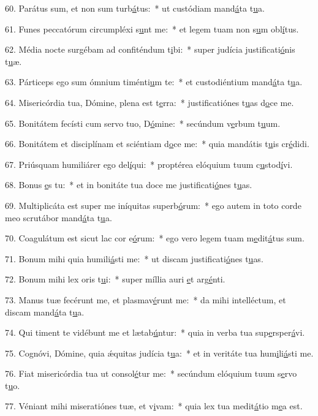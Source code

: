 60. Parátus sum, et non sum turb\uline{á}tus:~* ut custódiam mand\uline{á}ta t\uline{u}a.\par 
61. Funes peccatórum circumpléxi s\uline{u}nt me:~* et legem tuam non s\uline{u}m obl\uline{í}tus.\par 
62. Média nocte surgébam ad confiténdum t\uline{i}bi:~* super judícia justificati\uline{ó}nis t\uline{u}æ.\par 
63. Párticeps ego sum ómnium timénti\uline{u}m te:~* et custodiéntium mand\uline{á}ta t\uline{u}a.\par 
64. Misericórdia tua, Dómine, plena est t\uline{e}rra:~* justificatiónes t\uline{u}as d\uline{o}ce me.\par 
65. Bonitátem fecísti cum servo tuo, D\uline{ó}mine:~* secúndum v\uline{e}rbum t\uline{u}um.\par 
66. Bonitátem et disciplínam et sciéntiam d\uline{o}ce me:~* quia mandátis t\uline{u}is cr\uline{é}didi.\par 
67. Priúsquam humiliárer ego del\uline{í}qui:~* proptérea elóquium tuum c\uline{u}stod\uline{í}vi.\par 
68. Bonus \uline{e}s tu:~* et in bonitáte tua doce me justificati\uline{ó}nes t\uline{u}as.\par 
69. Multiplicáta est super me iníquitas superb\uline{ó}rum:~* ego autem in toto corde meo scrutábor mand\uline{á}ta t\uline{u}a.\par 
70. Coagulátum est sicut lac cor e\uline{ó}rum:~* ego vero legem tuam m\uline{e}dit\uline{á}tus sum.\par 
71. Bonum mihi quia humili\uline{á}sti me:~* ut discam justificati\uline{ó}nes t\uline{u}as.\par 
72. Bonum mihi lex oris t\uline{u}i:~* super míllia auri \uline{e}t arg\uline{é}nti.\par 
73. Manus tuæ fecérunt me, et plasmav\uline{é}runt me:~* da mihi intelléctum, et discam mand\uline{á}ta t\uline{u}a.\par 
74. Qui timent te vidébunt me et lætab\uline{ú}ntur:~* quia in verba tua sup\uline{e}rsper\uline{á}vi.\par 
75. Cognóvi, Dómine, quia ǽquitas judícia t\uline{u}a:~* et in veritáte tua hum\uline{i}li\uline{á}sti me.\par 
76. Fiat misericórdia tua ut consol\uline{é}tur me:~* secúndum elóquium tuum s\uline{e}rvo t\uline{u}o.\par 
77. Véniant mihi miseratiónes tuæ, et v\uline{i}vam:~* quia lex tua medit\uline{á}tio m\uline{e}a est.\par 
